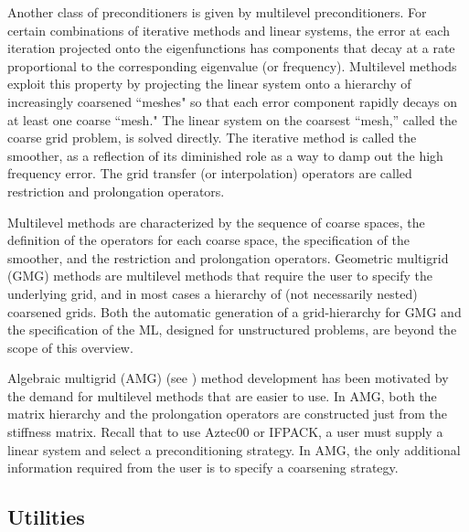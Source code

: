 \documentclass[10pt,relax]{SANDreport}
\begin{document}
Another class of preconditioners is given by multilevel
preconditioners.  For certain combinations of iterative methods and
linear systems, the error at each iteration projected onto the
eigenfunctions has components that decay at a rate proportional to the
corresponding eigenvalue (or frequency).  Multilevel methods exploit
this property \cite{Briggs} by projecting the linear system onto a
hierarchy of increasingly coarsened ``meshes" so that each error
component rapidly decays on at least one coarse ``mesh."  The linear
system on the coarsest ``mesh,'' called the coarse grid problem, is
solved directly.  The iterative method is called the smoother, as a
reflection of its diminished role as a way to damp out the high
frequency error.  The grid transfer (or interpolation) operators are
called restriction and prolongation
operators.

Multilevel methods are characterized by the sequence of coarse spaces,
the definition of the operators for each coarse space, the
specification of the smoother, and the restriction and prolongation
operators.  Geometric multigrid (GMG) methods are multilevel methods
that require the user to specify the underlying grid, and in most
cases a hierarchy of (not necessarily nested) coarsened grids.  Both
the automatic generation of a grid-hierarchy for GMG and the
specification of the ML, designed for unstructured problems, are
beyond the scope of this overview.

Algebraic multigrid (AMG) (see \cite[Section 8]{Briggs}) method
development has been motivated by the demand for multilevel methods
that are easier to use.  In AMG, both the matrix hierarchy and the
prolongation operators are constructed just from the stiffness matrix.
Recall that to use Aztec00 or IFPACK, a user must supply a linear
system and select a preconditioning strategy.  In AMG, the only
additional information required from the user is to specify a
coarsening strategy.

\subsection{Utilities}
\label{subsec:utilities}
\end{document}

